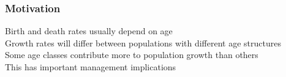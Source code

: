 \documentclass[color=usenames,dvipsnames]{beamer}\usepackage[]{graphicx}\usepackage[]{color}
\begin{document}
\begin{frame}
  \frametitle{Motivation}
  \Large
  Birth and death rates usually depend on age \\
  \pause
  \vfill
  Growth rates will differ between populations with
  different age structures \\
  \pause
  \vfill
  Some age classes contribute more to population growth than others \\
  \pause
  \vfill
  This has important management implications \\
\end{frame}
\end{document}
